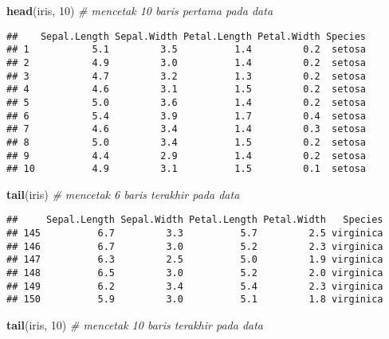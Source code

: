 \documentclass[]{article}
\newenvironment{Shaded}{\begin{snugshade}}{\end{snugshade}}
\newcommand{\KeywordTok}[1]{\textcolor[rgb]{0.13,0.29,0.53}{\textbf{#1}}}
\newcommand{\DecValTok}[1]{\textcolor[rgb]{0.00,0.00,0.81}{#1}}
\newcommand{\CommentTok}[1]{\textcolor[rgb]{0.56,0.35,0.01}{\textit{#1}}}
\newcommand{\NormalTok}[1]{#1}
\begin{document}
\begin{Shaded}
\begin{Highlighting}[]
\KeywordTok{head}\NormalTok{(iris, }\DecValTok{10}\NormalTok{) }\CommentTok{# mencetak 10 baris pertama pada data}
\end{Highlighting}
\end{Shaded}

\begin{verbatim}
##    Sepal.Length Sepal.Width Petal.Length Petal.Width Species
## 1           5.1         3.5          1.4         0.2  setosa
## 2           4.9         3.0          1.4         0.2  setosa
## 3           4.7         3.2          1.3         0.2  setosa
## 4           4.6         3.1          1.5         0.2  setosa
## 5           5.0         3.6          1.4         0.2  setosa
## 6           5.4         3.9          1.7         0.4  setosa
## 7           4.6         3.4          1.4         0.3  setosa
## 8           5.0         3.4          1.5         0.2  setosa
## 9           4.4         2.9          1.4         0.2  setosa
## 10          4.9         3.1          1.5         0.1  setosa
\end{verbatim}

\begin{Shaded}
\begin{Highlighting}[]
\KeywordTok{tail}\NormalTok{(iris) }\CommentTok{# mencetak 6 baris terakhir pada data}
\end{Highlighting}
\end{Shaded}

\begin{verbatim}
##     Sepal.Length Sepal.Width Petal.Length Petal.Width   Species
## 145          6.7         3.3          5.7         2.5 virginica
## 146          6.7         3.0          5.2         2.3 virginica
## 147          6.3         2.5          5.0         1.9 virginica
## 148          6.5         3.0          5.2         2.0 virginica
## 149          6.2         3.4          5.4         2.3 virginica
## 150          5.9         3.0          5.1         1.8 virginica
\end{verbatim}

\begin{Shaded}
\begin{Highlighting}[]
\KeywordTok{tail}\NormalTok{(iris, }\DecValTok{10}\NormalTok{) }\CommentTok{# mencetak 10 baris terakhir pada data}
\end{Highlighting}
\end{Shaded}
\end{document}
